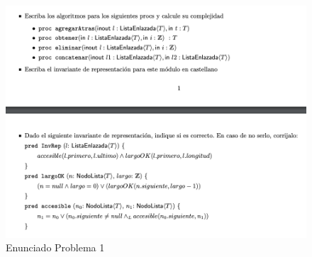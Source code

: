 \documentclass[10pt,a4paper]{article}
\begin{document}

\begin{figure}[h]
  \centering
  \includegraphics[width=\textwidth]{images/nuevo_ejercicio_1.png}
  \caption{Enunciado Problema 1}
  \label{fig:ej_1}
\end{figure}
\end{document}
